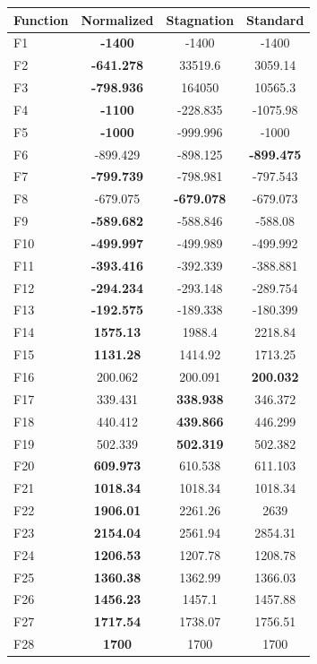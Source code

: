 \begin{tabular}{lccc}
\toprule
Function & Normalized & Stagnation & Standard \\
\midrule
F1 & \textbf{-1400} & -1400 & -1400 \\
F2 & \textbf{-641.278} & 33519.6 & 3059.14 \\
F3 & \textbf{-798.936} & 164050 & 10565.3 \\
F4 & \textbf{-1100} & -228.835 & -1075.98 \\
F5 & \textbf{-1000} & -999.996 & -1000 \\
F6 & -899.429 & -898.125 & \textbf{-899.475} \\
F7 & \textbf{-799.739} & -798.981 & -797.543 \\
F8 & -679.075 & \textbf{-679.078} & -679.073 \\
F9 & \textbf{-589.682} & -588.846 & -588.08 \\
F10 & \textbf{-499.997} & -499.989 & -499.992 \\
F11 & \textbf{-393.416} & -392.339 & -388.881 \\
F12 & \textbf{-294.234} & -293.148 & -289.754 \\
F13 & \textbf{-192.575} & -189.338 & -180.399 \\
F14 & \textbf{1575.13} & 1988.4 & 2218.84 \\
F15 & \textbf{1131.28} & 1414.92 & 1713.25 \\
F16 & 200.062 & 200.091 & \textbf{200.032} \\
F17 & 339.431 & \textbf{338.938} & 346.372 \\
F18 & 440.412 & \textbf{439.866} & 446.299 \\
F19 & 502.339 & \textbf{502.319} & 502.382 \\
F20 & \textbf{609.973} & 610.538 & 611.103 \\
F21 & \textbf{1018.34} & 1018.34 & 1018.34 \\
F22 & \textbf{1906.01} & 2261.26 & 2639 \\
F23 & \textbf{2154.04} & 2561.94 & 2854.31 \\
F24 & \textbf{1206.53} & 1207.78 & 1208.78 \\
F25 & \textbf{1360.38} & 1362.99 & 1366.03 \\
F26 & \textbf{1456.23} & 1457.1 & 1457.88 \\
F27 & \textbf{1717.54} & 1738.07 & 1756.51 \\
F28 & \textbf{1700} & 1700 & 1700 \\
\bottomrule
\end{tabular}
